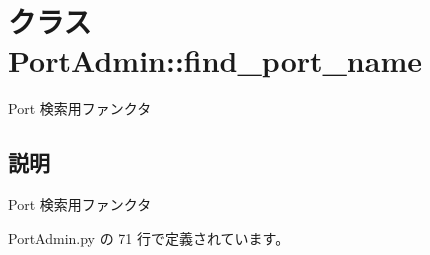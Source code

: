 \section{クラス PortAdmin::find\_\-port\_\-name}
\label{classsource__py_1_1_port_admin_1_1_port_admin_1_1find__port__name}
Port 検索用ファンクタ  




\subsection{説明}
Port 検索用ファンクタ 

 PortAdmin.py の 71 行で定義されています。